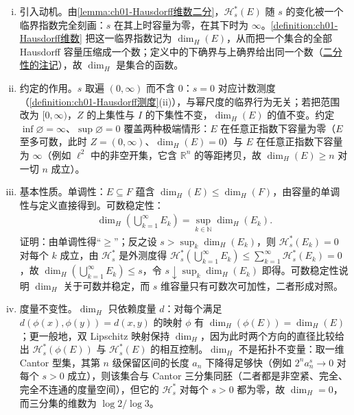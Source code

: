 \documentclass[../../main.tex]{subfiles}%
\begin{document}
\begin{remark}\label{remark:ch01-Hausdorff维数}
\begin{enumerate}[(i)]
\item 引入动机。由\cref{lemma:ch01-Hausdorff维数二分}，$\mathcal{H}_s^*(E)$ 随 $s$ 的变化被一个临界指数完全刻画：$s$ 在其上时容量为零，在其下时为 $\infty$。\cref{definition:ch01-Hausdorff维数} 把这一临界指数记为 $\dim_H(E)$，从而把一个集合的全部 Hausdorff 容量压缩成一个数；定义中的下确界与上确界给出同一个数（\hyperref[remark:ch01-Hausdorff维数二分]{二分性的注记}），故 $\dim_H$ 是集合的函数。
\item 约定的作用。$s$ 取遍 $(0,\infty)$ 而不含 $0$：$s=0$ 对应计数测度（\cref{definition:ch01-Hausdorff测度}(ii)），与幂尺度的临界行为无关；若把范围改为 $[0,\infty)$，$Z$ 的上集性与 $I$ 的下集性不变，$\dim_H(E)$ 的值不变。约定 $\inf\varnothing=\infty$、$\sup\varnothing=0$ 覆盖两种极端情形：$E$ 在任意正指数下容量为零（$E$ 至多可数，此时 $Z=(0,\infty)$、$\dim_H(E)=0$）与 $E$ 在任意正指数下容量为 $\infty$（例如 $\ell^2$ 中的非空开集，它含 $\mathbb{R}^n$ 的等距拷贝，故 $\dim_H(E)\geqslant n$ 对一切 $n$ 成立）。
\item 基本性质。单调性：$E\subseteq F$ 蕴含 $\dim_H(E)\leqslant\dim_H(F)$，由容量的单调性与定义直接得到。可数稳定性：
\begin{align*}
\dim_H\left(\bigcup_{k=1}^\infty E_k\right)=\sup_{k\in\mathbb{N}}\dim_H(E_k).
\end{align*}
证明：由单调性得“$\geqslant$”；反之设 $s>\sup_k\dim_H(E_k)$，则 $\mathcal{H}_s^*(E_k)=0$ 对每个 $k$ 成立，由 $\mathcal{H}_s^*$ 是外测度得 $\mathcal{H}_s^*\left(\bigcup_{k=1}^\infty E_k\right)\leqslant\sum_{k=1}^\infty\mathcal{H}_s^*(E_k)=0$，故 $\dim_H\left(\bigcup_{k=1}^\infty E_k\right)\leqslant s$，令 $s\downarrow\sup_k\dim_H(E_k)$ 即得。可数稳定性说明 $\dim_H$ 关于可数并稳定，而 $s$ 维容量只有可数次可加性，二者形成对照。
\item 度量不变性。$\dim_H$ 只依赖度量 $d$：对每个满足 $d(\phi(x),\phi(y))=d(x,y)$ 的映射 $\phi$ 有 $\dim_H(\phi(E))=\dim_H(E)$；更一般地，双 Lipschitz 映射保持 $\dim_H$，因为此时两个方向的直径比较给出 $\mathcal{H}_s^*(\phi(E))$ 与 $\mathcal{H}_s^*(E)$ 的相互控制。$\dim_H$ 不是拓扑不变量：取一维 Cantor 型集，其第 $n$ 级保留区间的长度 $a_n$ 下降得足够快（例如 $2^na_n^s\to0$ 对每个 $s>0$ 成立），则该集合与 Cantor 三分集同胚（二者都是非空紧、完全、完全不连通的度量空间），但它的 $\mathcal{H}_s^*$ 对每个 $s>0$ 都为零，故 $\dim_H=0$，而三分集的维数为 $\log2/\log3$。

\end{enumerate}
\end{remark}
\end{document}
